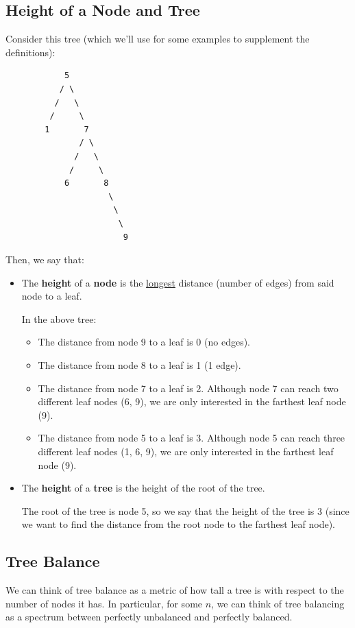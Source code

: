 \documentclass[letterpaper]{article}
\begin{document}
\subsection{Height of a Node and Tree}
Consider this tree (which we'll use for some examples to supplement the definitions):
\begin{verbatim}
            5
           / \ 
          /   \ 
         /     \ 
        1       7
               / \ 
              /   \ 
             /     \ 
            6       8 
                     \ 
                      \ 
                       \ 
                        9
\end{verbatim}

Then, we say that: 
\begin{itemize}
    \item The \textbf{height} of a \textbf{node} is the \underline{longest} distance (number of edges) from said node to a leaf. 
    
    \bigskip 

    In the above tree:
    \begin{itemize}
        \item The distance from node 9 to a leaf is 0 (no edges). 
        \item The distance from node 8 to a leaf is 1 (1 edge).
        \item The distance from node 7 to a leaf is 2. Although node 7 can reach two different leaf nodes (6, 9), we are only interested in the farthest leaf node (9).
        \item The distance from node 5 to a leaf is 3. Although node 5 can reach three different leaf nodes (1, 6, 9), we are only interested in the farthest leaf node (9). 
    \end{itemize}

    \item The \textbf{height} of a \textbf{tree} is the height of the root of the tree. 
    
    \bigskip 

    The root of the tree is node 5, so we say that the height of the tree is 3 (since we want to find the distance from the root node to the farthest leaf node).
\end{itemize}

\subsection{Tree Balance}
We can think of tree balance as a metric of how tall a tree is with respect to the number of nodes it has. In particular, for some $n$, we can think of tree balancing as a spectrum between perfectly unbalanced and perfectly balanced. 
\end{document}
